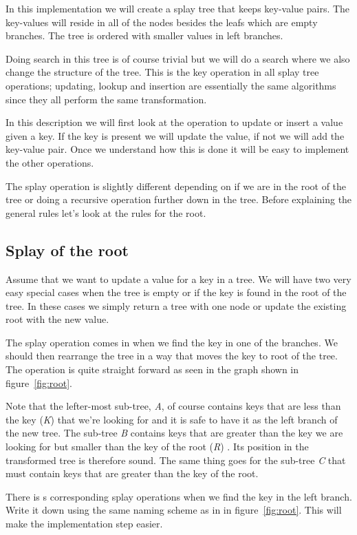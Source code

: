 \documentclass[a4paper,11pt]{article}
\begin{document}
In this implementation we will create a splay tree that keeps
key-value pairs. The key-values will reside in all of the nodes
besides the leafs which are empty branches. The tree is ordered with
smaller values in left branches.

Doing search in this tree is of course trivial but we will do a search
where we also change the structure of the tree. This is the key
operation in all splay tree operations; updating, lookup and insertion
are essentially the same algorithms since they all perform the same
transformation.


In this description we will first look at the operation to update or
insert a value given a key. If the key is present we will update the
value, if not we will add the key-value pair. Once we understand how
this is done it will be easy to implement the other operations. 

The splay operation is slightly different depending on if we are in
the root of the tree or doing a recursive operation further down in
the tree. Before explaining the general rules let's look at the rules
for the root.

\subsection{Splay of the root}
Assume that we want to update a value for a key in a tree. We will
have two very easy special cases when the tree is empty or if the key
is found in the root of the tree. In these cases we simply return a
tree with one node or update the existing root with the new
value. 

The splay operation comes in when we find the key in one of the
branches. We should then rearrange the tree in a way that moves the key 
to root of the tree. The operation is quite straight forward as seen
in the graph shown in figure~\ref{fig:root}. 

Note that the lefter-most sub-tree, {\em A}, of course contains keys
that are less than the key ({\em K}) that we're looking for and it is safe to
have it as the left branch of the new tree. The sub-tree {\em B}
contains keys that are greater than the key we are looking for but
smaller than the key of the root ({\em R}) . Its position in the transformed tree
is therefore sound. The same thing goes for the sub-tree {\em C} that
must contain keys that are greater than the key of the root.

There is s corresponding splay operations when we find the key in the
left branch. Write it down using the same naming scheme as in in
figure~\ref{fig:root}. This will make the implementation step easier.
\end{document}
